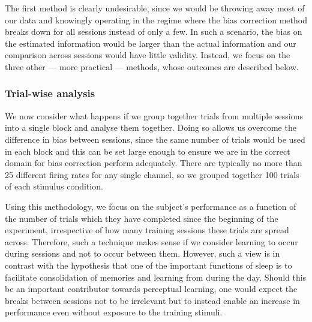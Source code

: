 The first method is clearly undesirable, since we would be throwing away most of our data and knowingly operating in the regime where the bias correction method breaks down for all sessions instead of only a few.
In such a scenario, the bias on the estimated information would be larger than the actual information and our comparison across sessions would have little validity.
Instead, we focus on the three other --- more practical --- methods, whose outcomes are described below.


\subsubsection{Trial-wise analysis}

We now consider what happens if we group together trials from multiple sessions into a single block and analyse them together.
Doing so allows us overcome the difference in bias between sessions, since the same number of trials would be used in each block and this can be set large enough to ensure we are in the correct domain for bias correction perform adequately.
There are typically no more than \num{25} different firing rates for any single channel, so we grouped together \num{100} trials of each stimulus condition.

Using this methodology, we focus on the subject's performance as a function of the number of trials which they have completed since the beginning of the experiment, irrespective of how many training sessions these trials are spread across.
Therefore, such a technique makes sense if we consider learning to occur during sessions and not to occur between them.
However, such a view is in contrast with the hypothesis that one of the important functions of sleep is to facilitate consolidation of memories and learning from during the day.
Should this be an important contributor towards perceptual learning, one would expect the breaks between sessions not to be irrelevant but to instead enable an increase in performance even without exposure to the training stimuli.


